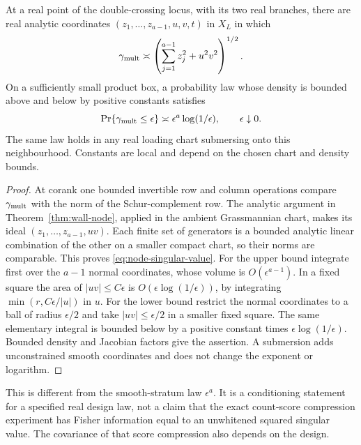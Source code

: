 \begin{corollary}
\label{cor:node-tail}
At a real point of the double-crossing locus, with its two real
branches, there are real analytic coordinates
$(z_1,\ldots,z_{a-1},u,v,t)$ in $X_L$ in which
\begin{equation}\label{eq:node-singular-value}
 \gamma_{\rm mult}\asymp
 \left(\sum_{j=1}^{a-1}z_j^2+u^2v^2\right)^{1/2}.
\end{equation}
On a sufficiently small product box, a probability law whose density
is bounded above and below by positive constants satisfies
\begin{equation}\label{eq:node-tail}
 \Pr\{\gamma_{\rm mult}\le\epsilon\}
       \asymp\epsilon^a\log(1/\epsilon),\qquad \epsilon\downarrow0.
\end{equation}
The same law holds in any real loading chart submersing onto this
neighbourhood. Constants are local and depend on the chosen chart and
density bounds.
\end{corollary}
\begin{proof}
At corank one bounded invertible row and column operations compare
$\gamma_{\rm mult}$ with the norm of the Schur-complement row.
The analytic argument in Theorem~\ref{thm:wall-node}, applied in the
ambient Grassmannian chart, makes its ideal
$(z_1,\ldots,z_{a-1},uv)$. Each finite set of generators is a bounded
analytic linear combination of the other on a smaller compact chart,
so their norms are comparable. This proves
\eqref{eq:node-singular-value}.
For the upper bound integrate first over the $a-1$ normal coordinates,
whose volume is $O(\epsilon^{a-1})$. In a fixed square the area of
$|uv|\le C\epsilon$ is $O(\epsilon\log(1/\epsilon))$, by integrating
$\min(r,C\epsilon/|u|)$ in $u$. For the lower bound restrict the
normal coordinates to a ball of radius $\epsilon/2$ and take
$|uv|\le\epsilon/2$ in a smaller fixed square. The same elementary
integral is bounded below by a positive constant times
$\epsilon\log(1/\epsilon)$. Bounded density and Jacobian factors give
the assertion. A submersion adds unconstrained smooth coordinates and
does not change the exponent or logarithm.
\end{proof}
This is different from the smooth-stratum law $\epsilon^a$.
It is a conditioning statement for a specified real design law, not a
claim that the exact count-score compression experiment has Fisher
information equal to an unwhitened squared singular value. The
covariance of that score compression also depends on the design.
